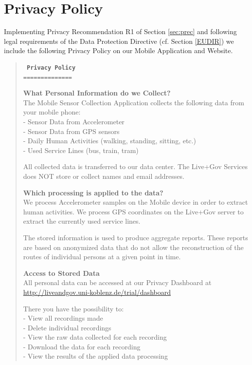 \pagebreak

\section{Privacy Policy} \label{sec:PP}
Implementing Privacy Recommendation R1 of Section \ref{sec:prec} and
following legal requirements of the Data Protection Directive
(cf. Section \ref{EUDIR}) we include the following Privacy Policy on
our Mobile Application and Website.

\begin{quote}
\tt \small
\textbf{Privacy Policy}\\
==============

\textbf{What Personal Information do we Collect?}\\
The Mobile Sensor Collection Application collects the following data from your mobile phone:\\
- Sensor Data from Accelerometer\\
- Sensor Data from GPS sensors\\
- Daily Human Activities (walking, standing, sitting, etc.)\\
- Used Service Lines (bus, train, tram)

All collected data is transferred to our data center. The Live+Gov
Services does NOT store or collect names and email addresses.

\textbf{Which processing is applied to the data?}\\
We process Accelerometer samples on the Mobile device in order to extract human activities.
We process GPS coordinates on the Live+Gov server to extract the currently used service lines.

The stored information is used to produce aggregate reports.
These reports are based on anonymized data that do not allow the reconstruction of the routes of individual persons at a given point in time.

\textbf{Access to Stored Data}\\
All personal data can be accessed at our Privacy Dashboard at
\url{http://liveandgov.uni-koblenz.de/trial/dashboard}

There you have the possibility to:\\
- View all recordings made\\
- Delete individual recordings\\
- View the raw data collected for each recording\\
- Download the data for each recording\\
- View the results of the applied data processing


\end{quote}
